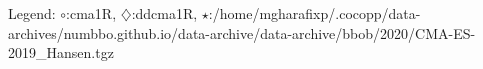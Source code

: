 Legend: {\color{NavyBlue}$\circ$}:cma1R, {\color{Magenta}$\diamondsuit$}:ddcma1R, {\color{Orange}$\star$}:/home/mgharafixp/.cocopp/data-archives/numbbo.github.io/data-archive/data-archive/bbob/2020/CMA-ES-2019\_Hansen.tgz